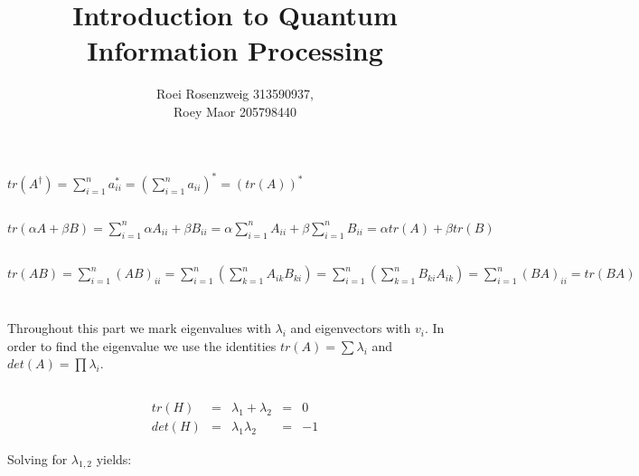 \documentclass[a4paper,10pt]{hw}
\title{Introduction to Quantum Information Processing}
\author{Roei Rosenzweig 313590937,\\ Roey Maor 205798440}
\begin{document}
\maketitle

\section{}

\subsection{}

$tr(A^{\dagger}) = \sum_{i=1}^{n}{a_{ii}^*} = (\sum_{i=1}^{n}{a_{ii}})^* = (tr(A))^*$

\subsection{}

$tr(\alpha A + \beta B) = \sum_{i=1}^{n}{\alpha A_{ii} + \beta B_{ii}} = \alpha\sum_{i=1}^{n}{A_{ii}} + \beta\sum_{i=1}^{n}{B_{ii}} = \alpha tr(A) + \beta tr(B)$

\subsection{}

$tr(AB) = \sum_{i=1}^{n}{(AB)_{ii}} = \sum_{i=1}^{n}{(\sum_{k=1}^{n}{A_{ik} B_{ki}})} = \sum_{i=1}^{n}{(\sum_{k=1}^{n}{B_{ki} A_{ik}})} = \sum_{i=1}^{n}{(BA)_{ii}} = tr(BA)$ 

\section{}

Throughout this part we mark eigenvalues with $\lambda_i$ and eigenvectors with $v_i$.
In order to find the eigenvalue we use the identities $tr(A) = \sum{\lambda_i}$ and $det(A) = \prod{\lambda_i}$.

\subsection{}

$$\begin{array}{lclcl}
   tr(H) & = & \lambda_{1} + \lambda_{2} & = & 0\\
   det(H) & = & \lambda_{1} \lambda_{2} & = & -1
\end{array}$$

Solving for $\lambda_{1,2}$ yields:
\end{document}
